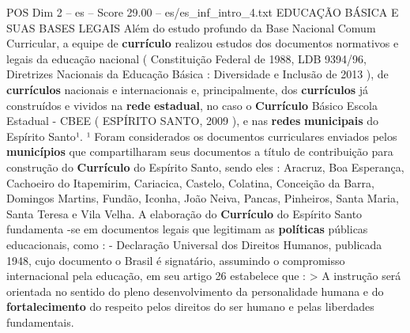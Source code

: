 \begin{textsample}{POS Dim 2 – es – Score 29.00 – es/es\_inf\_intro\_4.txt}  \label{ex:f2_pos_211}
EDUCAÇÃO BÁSICA E SUAS BASES LEGAIS Além do estudo profundo da Base Nacional Comum Curricular, a equipe de \textbf{currículo} realizou estudos dos documentos normativos e legais da educação nacional ( Constituição Federal de 1988, LDB 9394/96, Diretrizes Nacionais da Educação Básica : Diversidade e Inclusão de 2013 ), de \textbf{currículos} nacionais e internacionais e, principalmente, dos \textbf{currículos} já construídos e vividos na \textbf{rede} \textbf{estadual}, no caso o \textbf{Currículo} Básico Escola Estadual - CBEE ( ESPÍRITO SANTO, 2009 ), e nas \textbf{redes} \textbf{municipais} do Espírito Santo¹. ¹ Foram considerados os documentos curriculares enviados pelos \textbf{municípios} que compartilharam seus documentos a título de contribuição para construção do \textbf{Currículo} do Espírito Santo, sendo eles : Aracruz, Boa Esperança, Cachoeiro do Itapemirim, Cariacica, Castelo, Colatina, Conceição da Barra, Domingos Martins, Fundão, Iconha, João Neiva, Pancas, Pinheiros, Santa Maria, Santa Teresa e Vila Velha.
A elaboração do \textbf{Currículo} do Espírito Santo fundamenta -se em documentos legais que legitimam as \textbf{políticas} públicas educacionais, como : - Declaração Universal dos Direitos Humanos, publicada 1948, cujo documento o Brasil é signatário, assumindo o compromisso internacional pela educação, em seu artigo 26 estabelece que : > A instrução será orientada no sentido do pleno desenvolvimento da personalidade humana e do \textbf{fortalecimento} do respeito pelos direitos do ser humano e pelas liberdades fundamentais.

\end{textsample}
